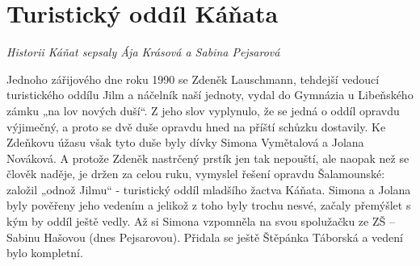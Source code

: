 \section{Turistický oddíl
Káňata}\label{turistickuxfd-odduxedl-kuxe1ux148ata}

\emph{Historii Káňat sepsaly Ája Krásová a Sabina Pejsarová}

Jednoho zářijového dne roku 1990 se Zdeněk Lauschmann, tehdejší vedoucí
turistického oddílu Jilm a náčelník naší jednoty, vydal do Gymnázia u
Libeňského zámku „na lov nových duší``. Z jeho slov vyplynulo, že se
jedná o oddíl opravdu výjimečný, a proto se dvě duše opravdu hned na
příští schůzku dostavily. Ke Zdeňkovu úžasu však tyto duše byly dívky
Simona Vymětalová a Jolana Nováková. A protože Zdeněk nastrčený prstík
jen tak nepouští, ale naopak než se člověk naděje, je držen za celou
ruku, vymyslel řešení opravdu Šalamounské: založil „odnož Jilmu`` -
turistický oddíl mladšího žactva Káňata. Simona a Jolana byly pověřeny
jeho vedením a jelikož z toho byly trochu nesvé, začaly přemýšlet s kým
by oddíl ještě vedly. Až si Simona vzpomněla na svou spolužačku ze ZŠ --
Sabinu Hašovou (dnes Pejsarovou). Přidala se ještě Štěpánka Táborská a
vedení bylo kompletní.

